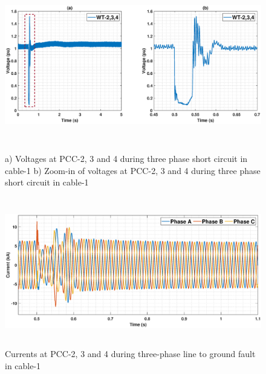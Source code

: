 \begin{figure}[H]
\hspace*{-1.2cm}
\captionsetup{justification=centering}
    \includegraphics[height = 7.5cm,width = 19.25cm]{Diagrams/Chapter_5/VACP_WT234_3phaseSC.eps}
    \caption{a) Voltages at PCC-2, 3 and 4 during three phase short circuit in cable-1 b) Zoom-in of voltages at PCC-2, 3 and 4 during three phase short circuit in cable-1}
    \label{VACP_WT234_3phaseSC}
\end{figure}


\begin{figure}[H]
\centering
\captionsetup{justification=centering}
    \includegraphics[height = 6.5cm,width = 17.25cm]{Diagrams/Chapter_5/IABC_WT234_3phaseSC.eps}
    \caption{Currents at PCC-2, 3 and 4 during three-phase line to ground fault in cable-1}
    \label{IABC_WT234_3phaseSC}
\end{figure}

